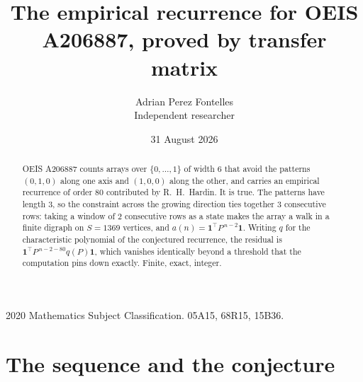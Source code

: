 \documentclass[11pt,a4paper]{article}
\title{The empirical recurrence for OEIS A206887, proved by transfer matrix}
\author{Adrian Perez Fontelles\\ \small Independent researcher}
\date{31 August 2026}
\theoremstyle{plain}
\theoremstyle{definition}
\begin{document}
\maketitle

\begin{abstract}
OEIS A206887 counts arrays over $\{0,\dots,1\}$ of width $6$ that avoid the patterns
$(0,1,0)$ along one axis and $(1,0,0)$ along the other, and carries an empirical recurrence of
order $80$ contributed by R.~H.~Hardin. It is true. The patterns have length $3$, so
the constraint across the growing direction ties together $3$ consecutive rows: taking a
window of $2$ consecutive rows as a state makes the array a walk in a finite digraph
on $S=1369$ vertices, and $a(n)=\mathbf{1}^{\!\top}P^{\,n-2}\mathbf{1}$. Writing $q$
for the characteristic polynomial of the conjectured recurrence, the residual is
$\mathbf{1}^{\!\top}P^{\,n-2-80}q(P)\mathbf{1}$, which vanishes identically
beyond a threshold that the computation pins down exactly. Finite, exact, integer.
\end{abstract}

\noindent\small 2020 Mathematics Subject Classification. 05A15, 68R15, 15B36.\normalsize

\section{The sequence and the conjecture}
\end{document}
